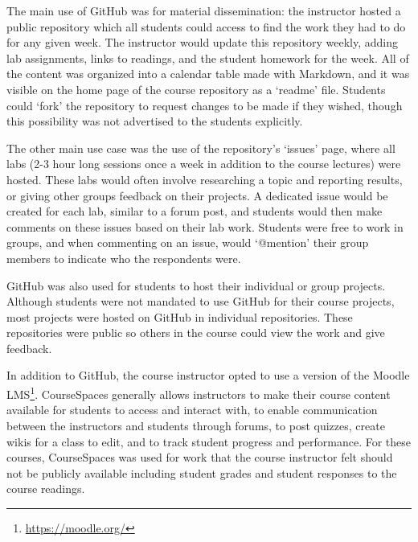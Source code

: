 The main use of GitHub was for material dissemination: the instructor hosted a public repository which all students could access to find the work they had to do for any given week. The instructor would update this repository weekly, adding lab assignments, links to readings, and the student homework for the week. All of the content was organized into a calendar table made with Markdown, and it was visible on the home page of the course repository as a `readme' file. Students could `fork' the repository to request changes to be made if they wished, though this possibility was not advertised to the students explicitly.

The other main use case was the use of the repository's `issues' page, where all labs (2-3 hour long sessions once a week in addition to the course lectures) were hosted. These labs would often involve researching a topic and reporting results, or giving other groups feedback on their projects. A dedicated issue would be created for each lab, similar to a forum post, and students would then make comments on these issues based on their lab work. Students were free to work in groups, and when commenting on an issue, would `@mention' their group members to indicate who the respondents were.

GitHub was also used for students to host their individual or group projects. Although students were not mandated to use GitHub for their course projects, most projects were hosted on GitHub in individual repositories. These repositories were public so others in the course could view the work and give feedback.

In addition to GitHub, the course instructor opted to use a version of the Moodle LMS\footnote{\url{https://moodle.org/}}. CourseSpaces generally allows instructors to make their course content available for students to access and interact with, to enable communication between the instructors and students through forums, to post quizzes, create wikis for a class to edit, and to track student progress and performance. For these courses, CourseSpaces was used for work that the course instructor felt should not be publicly available including student grades and student responses to the course readings.
